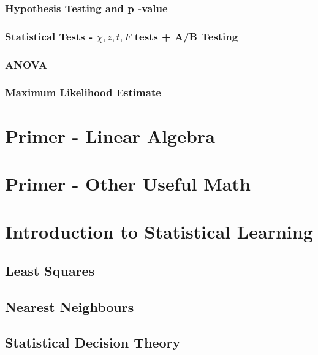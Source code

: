 \documentclass[12pt]{article}
\begin{document}
\subsubsection{Hypothesis Testing and p -value}
\subsubsection{Statistical Tests - $\chi, z, t, F$ tests + A/B Testing} 
\subsubsection{ANOVA}
\subsubsection{Maximum Likelihood Estimate}

\newpage


\section{Primer - Linear Algebra}


\newpage


\section{Primer - Other Useful Math}

\newpage

\section{Introduction to Statistical Learning}
\subsection{Least Squares}

\subsection{Nearest Neighbours}

\subsection{Statistical Decision Theory}
\end{document}
